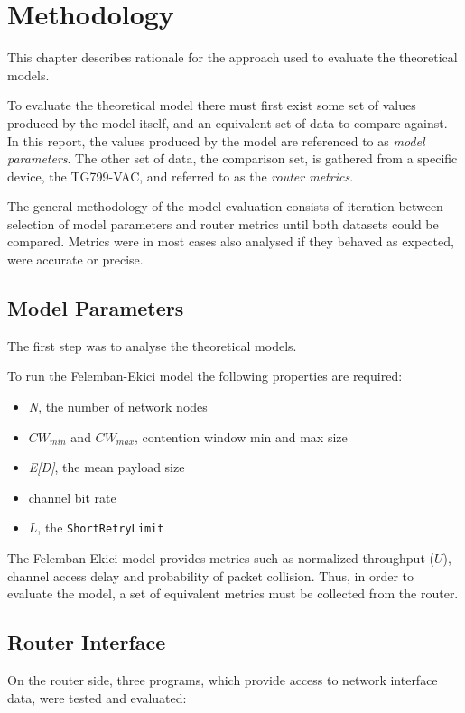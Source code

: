 \chapter{Methodology}

This chapter describes rationale for the approach used to evaluate the theoretical models.

To evaluate the theoretical model there must first exist some set of values produced by the model itself, and an equivalent set of data to compare against. In this report, the values produced by the model are referenced to as \emph{model parameters}. The other set of data, the comparison set, is gathered from a specific device, the TG799-VAC, and referred to as the \emph{router metrics}.

The general methodology of the model evaluation consists of iteration between selection of model parameters and router metrics until both datasets could be compared. Metrics were in most cases also analysed if they behaved as expected, were accurate or precise.

\section{Model Parameters}
The first step was to analyse the theoretical models.

To run the Felemban-Ekici model the following properties are required:

\begin{itemize}
	\item \emph{N}, the number of network nodes
	\item $CW_{min}$ and $CW_{max}$, contention window min and max size
	\item \emph{E[D]}, the mean payload size
	\item channel bit rate
	\item $L$, the \texttt{ShortRetryLimit}
\end{itemize}

The Felemban-Ekici model provides metrics such as normalized throughput ($U$), channel access delay and probability of packet collision. Thus, in order to evaluate the model, a set of equivalent metrics must be collected from the router.

\section{Router Interface}

On the router side, three programs, which provide access to network interface data, were tested and evaluated:

